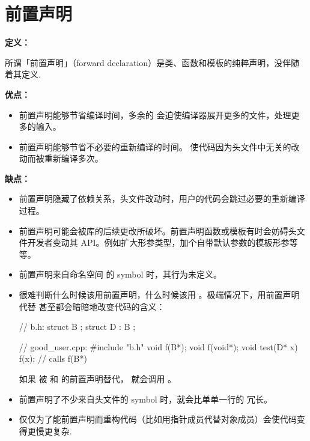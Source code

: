 \section{前置声明} \label{forward-declarations}


\textbf{定义：}

所谓「前置声明」（forward declaration）是类、函数和模板的纯粹声明，没伴随着其定义.

\textbf{优点：}

\begin{itemize}
	\item 前置声明能够节省编译时间，多余的  会迫使编译器展开更多的文件，处理更多的输入。
	\item 前置声明能够节省不必要的重新编译的时间。  使代码因为头文件中无关的改动而被重新编译多次。
\end{itemize}

\textbf{缺点：}

\begin{itemize}
	\item 前置声明隐藏了依赖关系，头文件改动时，用户的代码会跳过必要的重新编译过程。
	\item 前置声明可能会被库的后续更改所破坏。前置声明函数或模板有时会妨碍头文件开发者变动其 API。例如扩大形参类型，加个自带默认参数的模板形参等等。
	\item 前置声明来自命名空间  的 symbol 时，其行为未定义。
	\item 很难判断什么时候该用前置声明，什么时候该用  。极端情况下，用前置声明代替  甚至都会暗暗地改变代码的含义：

\begin{cppcode}
// b.h:
struct B {};
struct D : B {};

// good_user.cpp:
#include "b.h"
void f(B*);
void f(void*);
void test(D* x) { f(x); }  // calls f(B*)
\end{cppcode}

	      如果  被  和  的前置声明替代，  就会调用  。	\item 前置声明了不少来自头文件的 symbol 时，就会比单单一行的  冗长。
	\item 仅仅为了能前置声明而重构代码（比如用指针成员代替对象成员）会使代码变得更慢更复杂.
\end{itemize}

